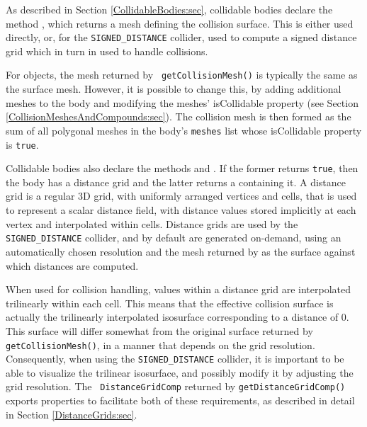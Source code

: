 As described in Section \ref{CollidableBodies:sec}, collidable bodies
declare the method
,
which returns a mesh defining the collision surface.  This is either
used directly, or, for the {\tt SIGNED\_DISTANCE} collider, used
to compute a signed distance grid which in turn in used to handle
collisions.

For  objects, the mesh returned by {\tt
getCollisionMesh()} is typically the same as the surface mesh.
However, it is possible to change this, by adding additional meshes to
the body and modifying the meshes' {\sf isCollidable} property (see
Section
\ref{CollisionMeshesAndCompounds:sec}). The collision mesh is then formed
as the sum of all polygonal meshes in the body's {\tt meshes} list
whose {\sf isCollidable} property is {\tt true}.

Collidable bodies also declare the methods
and
.
If the former returns {\tt true}, then the body has a distance grid
and the latter returns a 
containing it.  A distance grid is a regular 3D grid, with uniformly
arranged vertices and cells, that is used to represent a scalar
distance field, with distance values stored implicitly at each vertex
and interpolated within cells. Distance grids are used by the {\tt
SIGNED\_DISTANCE} collider, and by default are generated
on-demand, using an automatically chosen resolution and the mesh
returned by
as the surface against which distances are computed.

When used for collision handling, values within a distance grid are
interpolated trilinearly within each cell. This means that the
effective collision surface is actually the trilinearly interpolated
isosurface corresponding to a distance of 0. This surface will differ
somewhat from the original surface returned by {\tt
getCollisionMesh()}, in a manner that depends on the grid resolution.
Consequently, when using the {\tt SIGNED\_DISTANCE} collider, it
is important to be able to visualize the trilinear isosurface, and
possibly modify it by adjusting the grid resolution. The {\tt
DistanceGridComp} returned by {\tt getDistanceGridComp()} exports
properties to facilitate both of these requirements, as described in
detail in Section \ref{DistanceGrids:sec}.

